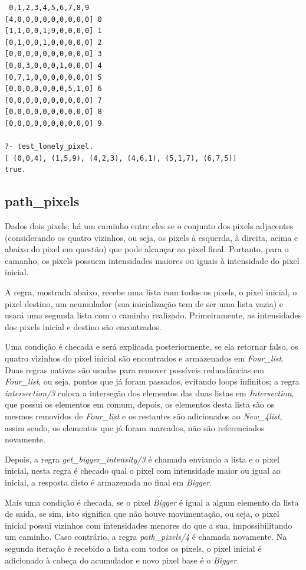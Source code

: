 \documentclass{article}
\begin{document}
        \begin{verbatim}
 0,1,2,3,4,5,6,7,8,9
[4,0,0,0,0,0,0,0,0,0] 0
[1,1,0,0,1,9,0,0,0,0] 1
[0,1,0,0,1,0,0,0,0,0] 2
[0,0,0,0,0,0,0,0,0,0] 3
[0,0,3,0,0,0,1,0,0,0] 4
[0,7,1,0,0,0,0,0,0,0] 5
[0,0,0,0,0,0,0,5,1,0] 6
[0,0,0,0,0,0,0,0,0,0] 7
[0,0,0,0,0,0,0,0,0,0] 8
[0,0,0,0,0,0,0,0,0,0] 9

?- test_lonely_pixel.
[ (0,0,4), (1,5,9), (4,2,3), (4,6,1), (5,1,7), (6,7,5)]
true.

        \end{verbatim}

    \newpage
    \subsection*{path\_pixels}
        Dados dois pixels, há um caminho entre eles se o conjunto dos pixels adjacentes (considerando os quatro vizinhos, ou seja, os pixels à esquerda, à direita, acima e abaixo do pixel em questão) que pode alcançar ao pixel final. Portanto, para o camanho, os pixels possuem intensidades maiores ou iguais à intensidade do pixel inicial.
        
        A regra, mostrada abaixo, recebe uma lista com todos os pixels, o pixel inicial, o pixel destino, um acumulador (sua inicialização tem de ser uma lista vazia) e usará uma segunda lista com o caminho realizado. Primeiramente, as intensidades dos pixels inicial e destino são encontrados.
        
        Uma condição é checada e será explicada posteriormente, se ela retornar falso, os quatro vizinhos do pixel inicial são encontrados e armazenados em \textit{Four\_list}. Duas regras nativas são usadas para remover possíveis redundâncias em \textit{Four\_list}, ou seja, pontos que já foram passados, evitando loops infinitos; a regra \textit{intersection/3} coloca a interseção dos elementos das duas listas em \textit{Intersection}, que possui os elementos em comum, depois, os elementos desta lista são os mesmos removidos de \textit{Four\_list} e os restantes são adicionados ao \textit{New\_4list}, assim sendo, os elementos que já foram marcados, não são referenciados novamente.
        
        Depois, a regra \textit{get\_bigger\_intensity/3} é chamada enviando a lista e o pixel inicial, nesta regra é checado qual o pixel com intensidade maior ou igual ao inicial, a resposta disto é armazenada no final em \textit{Bigger}.
        
        Mais uma condição é checada, se o pixel \textit{Bigger} é igual a algum elemento da lista de saída, se sim, isto significa que não houve movimentação, ou seja, o pixel inicial possui vizinhos com intensidades menores do que a sua, impossibilitando um caminho. Caso contrário, a regra \textit{path\_pixels/4} é chamada novamente. Na segunda iteração é recebido a lista com todos os pixels, o pixel inicial é adicionado à cabeça do acumulador e novo pixel base é o \textit{Bigger}.
        
\end{document}
